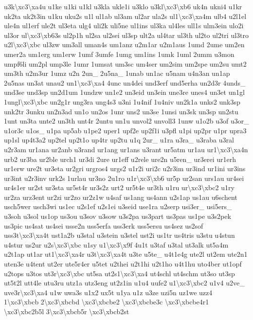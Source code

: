 \begin{DoxyCompactItemize}
u3k\textbackslash{}xc3\textbackslash{}xa4u u1ke u1ki u1kl u3kla ukle1i u3klo u3kl\textbackslash{}xc3\textbackslash{}xb6 uk4n ukni4 u1kr uk2ta uk2t3in u1ku uku2s u1l ul1ab ul3am ul2ar ula2s ul1\textbackslash{}xc3\textbackslash{}xa4m ulb4 u2l1el ule4n ul1erf ule2t ul3eta ulg4 uli2k uli5ne ul1ins ul3ka ul4les ull1s ulm3ein ulo2i ul3or ul\textbackslash{}xc3\textbackslash{}xb63s ul2p1h ul2sa ul2sei ul3sp ult2a ul4tar ul3th ul2to ul2tri ul3tro u2l\textbackslash{}xc3\textbackslash{}xbc ul3zw um3all uman4s um1anz u2m1ar u2m1aus 1umd 2ume um2en umer2a um1erg um1erw 1umf 3umfe 1umg um1ins 1umk 1uml 2umm u3mon umpf6li um2pl ump3le 1umr 1umsat um3sc um4ser um2sim um2spe um2su umt2 um3th u2m3ur 1umz u2n 2un\-\_\- 2u5na\-\_\- 1unab un1ac u5nam u4n3an un1ap 2u5nas un3at unau2 un1\textbackslash{}xc3\textbackslash{}xa4 4unc un4dei und3erf und5erha un2d3r 4unds\-\_\- und3se und3sp un2d1um 1undzw un1e2 un3eid un3ein une3re unes4 un3et un1gl 1ungl\textbackslash{}xc3\textbackslash{}xbc un2g1r ung3ra ung4s3 u3ni 1u4nif 1u4niv un2k1a unks2 unk3sp unk2tr 3unku un2n3ad un1o un2os 1unr uns2 un3se 1unsi un3sk un3sp un2stu 1unt un3ta unte2 un3th unt4r 2untu un1u unvol2 unvoll3 1unw u1o2b u3of u3or\-\_\- u1or3c u1os\-\_\- u1pa up5ab u1pe2 uper1 upf2e up2f1i u3pfl u1pi up2pr u1pr upra3 up1sl up4t3a2 up2tel up2t1o up4tr up2tu u1q 2ur\-\_\- u1ra u3ra\-\_\- u3raba u3ral u2r3am ur1ana ur2anb u3rand ur1ang ur1ans u3rant ur5atm ur1au ur1\textbackslash{}xc3\textbackslash{}xa4n urb2 ur3ba ur2ble urch1 ur3di 2ure ur1eff u2rele ure2n u5ren\-\_\- ur3erei ur1erh ur1erw ure2t ur3eta ur2gri urgros4 urgs2 u1r2i uri2c u2r3im ur3ind ur1ini ur3ins ur3int u2r3inv urk2s 1urlau ur3no 2u1ro u1r\textbackslash{}xc3\textbackslash{}xb6 ur5p ur2san urs1au ur4sei ur4s1er ur2st ur3sta ur5st4r ur3s2z urt2 ur5t4e ur3th u1ru ur\textbackslash{}xc3\textbackslash{}xbc2 u1ry ur2za urz3ent ur2zi ur2zo ur2z1w u4saf us1ang us4ann u2s1ap us1au u6schent usch5wer usch3wi us1ec u2s1ef u2s1ei u3seid use1ra u2serp usi3er\-\_\- usi5ers\-\_\- u3soh u3sol us1op us3ou u3sov u3sow u3s2pa us3part us3pas us1pe u3s2pek us3pic us4sat us4sei usse2n uss5erfa uss3erk uss5ersu us4sez us2sof uss3t\textbackslash{}xc3\textbackslash{}xa4t ust1a2b u3stal u3stein u3stel ust2i us1tr us4tris u3stu u4stun u4stur us2ur u2s\textbackslash{}xc3\textbackslash{}xbc u1sy u1\textbackslash{}xc3\textbackslash{}x9f 4u1t u3taf u3tal ut3alk ut5a4m u2t1ap ut1ar ut1\textbackslash{}xc3\textbackslash{}xa4r u3t\textbackslash{}xc3\textbackslash{}xa4t u3te u5te\-\_\- u4t1e4g ute2l ut2em ute2n1 uten3e u4tent ut2er ute5r4er u5tet u2thei u2t1hi u2t1ho u4t1hu uto4ber ut1opf u2tops u3tos ut3r\textbackslash{}xc3\textbackslash{}xbc ut5sa ut2s1\textbackslash{}xc3\textbackslash{}xa4 ut4schl ut4schm ut3so ut3sp ut5t2l utt4le utu3ru utz1a utz3eng ut2z1in u1u4 uufe2 u1\textbackslash{}xc3\textbackslash{}xbc2 u1v4 u2ve\-\_\- uve3r\textbackslash{}xc3\textbackslash{}xa4 u1w uwa3s u1x2 ux5t u1ya u1z u3ze uzi5n uz1we uzz4 1\textbackslash{}xc3\textbackslash{}xbcb 2\textbackslash{}xc3\textbackslash{}xbcbd \textbackslash{}xc3\textbackslash{}xbcbe2 \textbackslash{}xc3\textbackslash{}xbcbe3c \textbackslash{}xc3\textbackslash{}xbcbe4r1 \textbackslash{}xc3\textbackslash{}xbc2b5l 3\textbackslash{}xc3\textbackslash{}xbcb5r \textbackslash{}xc3\textbackslash{}xbcb2st 
\end{DoxyCompactItemize}

